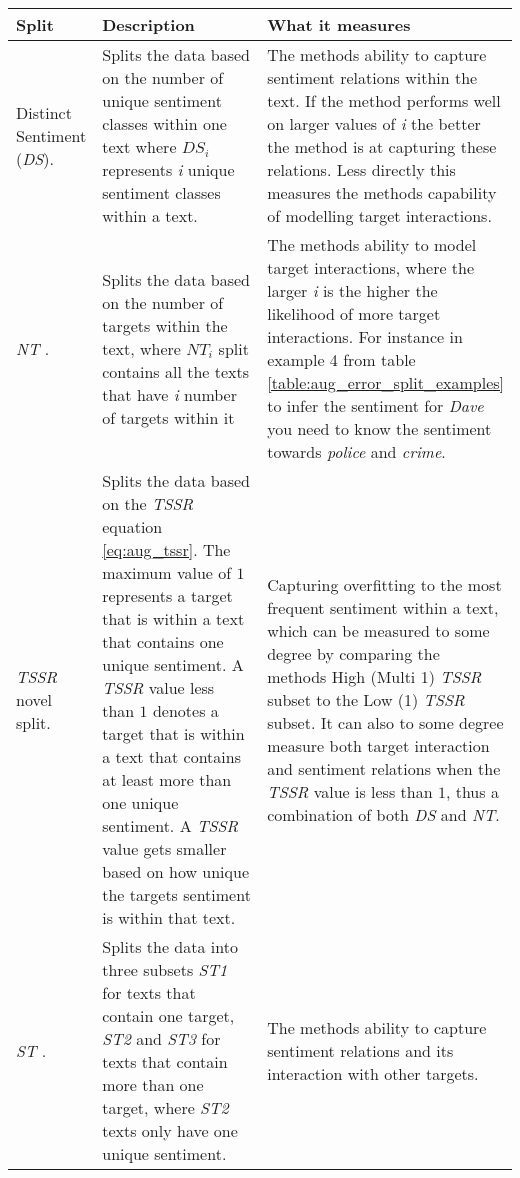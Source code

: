 \begin{longtable}{|p{0.15\linewidth}|p{0.45\linewidth}|p{0.4\linewidth}|}
\hline
Split & Description & What it measures \\
\hline
Distinct Sentiment (\textit{DS})\citep{aug_wang_2017}. & Splits the data based on the number of unique sentiment classes within one text where $DS_i$ represents \textit{i} unique sentiment classes within a text. &  The methods ability to capture sentiment relations within the text. If the method performs well on larger values of \textit{i} the better the method is at capturing these relations. Less directly this measures the methods capability of modelling target interactions. \\
\hline
\textit{NT} \citep{aug_zhang2019aspectbased}. & Splits the data based on the number of targets within the text, where $NT_i$ split contains all the texts that have \textit{i} number of targets within it & The methods ability to model target interactions, where the larger \textit{i} is the higher the likelihood of more target interactions. For instance in example 4 from table \ref{table:aug_error_split_examples} to infer the sentiment for \textit{Dave} you need to know the sentiment towards \textit{police} and \textit{crime}.\\
\hline
\textit{TSSR} novel split. & Splits the data based on the \textit{TSSR} equation \ref{eq:aug_tssr}. The maximum value of $1$ represents a target that is within a text that contains one unique sentiment. A \textit{TSSR} value less than $1$ denotes a target that is within a text that contains at least more than one unique sentiment. A \textit{TSSR} value gets smaller based on how unique the targets sentiment is within that text. & Capturing overfitting to the most frequent sentiment within a text, which can be measured to some degree by comparing the methods High (Multi 1) \textit{TSSR} subset to the Low (1) \textit{TSSR} subset. It can also to some degree measure both target interaction and sentiment relations when the \textit{TSSR} value is less than $1$, thus a combination of both \textit{DS} and \textit{NT}.\\
\hline
\textit{ST} \citep{aug_nguyen-shirai-2015-phrasernn}. & Splits the data into three subsets \textit{ST1} for texts that contain one target, \textit{ST2} and \textit{ST3} for texts that contain more than one target, where \textit{ST2} texts only have one unique sentiment. & The methods ability to capture sentiment relations and its interaction with other targets. \\

\end{longtable}

